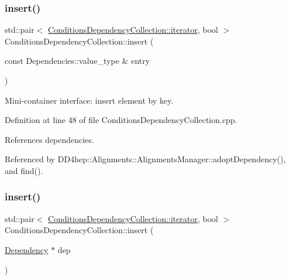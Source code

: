 \subsubsection{\texorpdfstring{insert()}{insert()}\hspace{0.1cm}{\footnotesize\ttfamily [1/2]}}
{\footnotesize\ttfamily std\+::pair$<$ \hyperlink{class_d_d4hep_1_1_conditions_1_1_conditions_dependency_collection_a685a1a6841f2fa4d70ab9a9bfb7b0b6a}{Conditions\+Dependency\+Collection\+::iterator}, bool $>$ Conditions\+Dependency\+Collection\+::insert (\begin{DoxyParamCaption}\item[{const Dependencies\+::value\+\_\+type \&}]{entry }\end{DoxyParamCaption})}



Mini-\/container interface\+: insert element by key. 



Definition at line 48 of file Conditions\+Dependency\+Collection.\+cpp.



References dependencies.



Referenced by D\+D4hep\+::\+Alignments\+::\+Alignments\+Manager\+::adopt\+Dependency(), and find().

\hypertarget{class_d_d4hep_1_1_conditions_1_1_conditions_dependency_collection_a2f8d2a2f72821fbf0c223f24b9b074af}{}\label{class_d_d4hep_1_1_conditions_1_1_conditions_dependency_collection_a2f8d2a2f72821fbf0c223f24b9b074af} 
\subsubsection{\texorpdfstring{insert()}{insert()}\hspace{0.1cm}{\footnotesize\ttfamily [2/2]}}
{\footnotesize\ttfamily std\+::pair$<$ \hyperlink{class_d_d4hep_1_1_conditions_1_1_conditions_dependency_collection_a685a1a6841f2fa4d70ab9a9bfb7b0b6a}{Conditions\+Dependency\+Collection\+::iterator}, bool $>$ Conditions\+Dependency\+Collection\+::insert (\begin{DoxyParamCaption}\item[{\hyperlink{class_d_d4hep_1_1_conditions_1_1_conditions_dependency_collection_a87252585d3e17ae82813c039b1b47e8a}{Dependency} $\ast$}]{dep }\end{DoxyParamCaption})}




